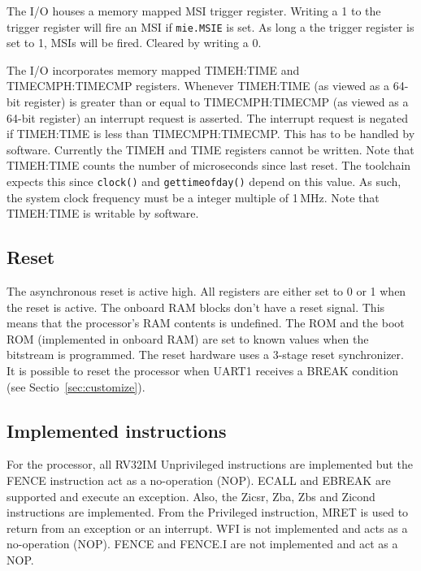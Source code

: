 \documentclass[12pt]{article}
\begin{document}
The I/O houses a memory mapped MSI trigger register. Writing a 1 to the trigger register will fire an MSI if \lstinline[breaklines=false]|mie.MSIE| is set. As long a the trigger register is set to 1, MSIs will be fired. Cleared by writing a 0.

The I/O incorporates memory mapped TIMEH:TIME and TIMECMPH:TIMECMP registers. Whenever TIMEH:TIME (as viewed as a 64-bit register) is greater than or equal to TIMECMPH:TIMECMP (as viewed as a 64-bit register) an interrupt request is asserted. The interrupt request is negated if TIMEH:TIME is less than TIMECMPH:TIMECMP. This has to be handled by software. Currently the TIMEH and TIME registers cannot be written. Note that TIMEH:TIME counts the number of microseconds since last reset. The toolchain expects this since \lstinline|clock()| and \lstinline|gettimeofday()| depend on this value. As such, the system clock frequency must be a integer multiple of 1\,MHz. Note that TIMEH:TIME is writable by software.

\subsection{Reset}
The asynchronous reset is active high. All registers are either set to 0 or 1 when the reset is active. The onboard RAM blocks don't have a reset signal. This means that the processor's RAM contents is undefined. The ROM and the boot ROM (implemented in onboard RAM) are set to known values when the bitstream is programmed. The reset hardware uses a 3-stage reset synchronizer. It is possible to reset the processor when UART1 receives a BREAK condition (see Sectio~\ref{sec:customize}).

\subsection{Implemented instructions}
For the processor, all RV32IM Unprivileged instructions are implemented but the FENCE instruction act as a no-operation (NOP). ECALL and EBREAK are supported and execute an exception. Also, the Zicsr, Zba, Zbs and Zicond instructions are implemented. From the Privileged instruction, MRET is used to return from an exception or an interrupt. WFI is not implemented and acts as a no-operation (NOP). FENCE and FENCE.I are not implemented and act as a NOP.
\end{document}
